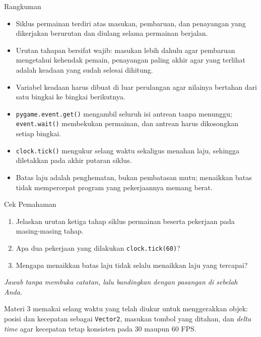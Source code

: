 \documentclass[aspectratio=169,10pt]{beamer}
\begin{document}
\begin{frame}{Rangkuman}
\begin{itemize}
  \item Siklus permainan terdiri atas masukan, pembaruan, dan penayangan yang
        dikerjakan berurutan dan diulang selama permainan berjalan.
  \item Urutan tahapan bersifat wajib: masukan lebih dahulu agar pembaruan
        mengetahui kehendak pemain, penayangan paling akhir agar yang terlihat
        adalah keadaan yang sudah selesai dihitung.
  \item Variabel keadaan harus dibuat di luar perulangan agar nilainya bertahan
        dari satu bingkai ke bingkai berikutnya.
  \item \texttt{pygame.event.get()} mengambil seluruh isi antrean tanpa
        menunggu; \texttt{event.wait()} membekukan permainan, dan antrean harus
        dikosongkan setiap bingkai.
  \item \texttt{clock.tick()} mengukur selang waktu sekaligus menahan laju,
        sehingga diletakkan pada akhir putaran siklus.
  \item Batas laju adalah penghematan, bukan pembatasan mutu; menaikkan batas
        tidak mempercepat program yang pekerjaannya memang berat.
\end{itemize}
\end{frame}

\begin{frame}{Cek Pemahaman}
\begin{enumerate}
  \item Jelaskan urutan ketiga tahap siklus permainan beserta pekerjaan pada
        masing-masing tahap.
  \item Apa dua pekerjaan yang dilakukan \texttt{clock.tick(60)}?
  \item Mengapa menaikkan batas laju tidak selalu menaikkan laju yang
        tercapai?
\end{enumerate}
\vspace{0.35cm}
{\footnotesize\color{ubMuted}\itshape Jawab tanpa membuka catatan, lalu
bandingkan dengan pasangan di sebelah Anda.}
\end{frame}

  {Materi 3 memakai selang waktu yang telah diukur untuk menggerakkan objek:
   posisi dan kecepatan sebagai \texttt{Vector2}, masukan tombol yang ditahan,
   dan \emph{delta time} agar kecepatan tetap konsisten pada 30 maupun 60 FPS.}
\end{document}
